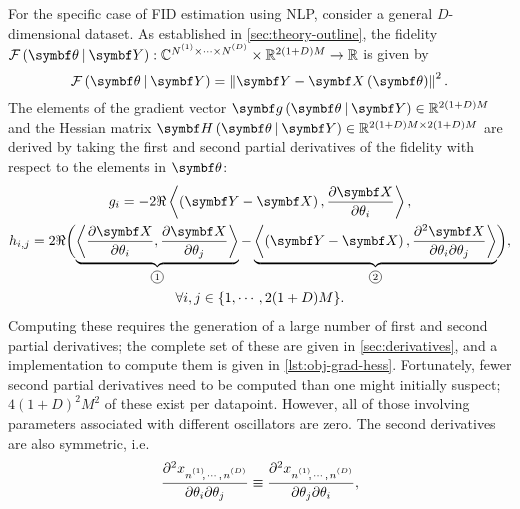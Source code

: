 For the specific case of \ac{FID} estimation using \ac{NLP}, consider a general
$D$-dimensional dataset. As established in \cref{sec:theory-outline}, the
fidelity $\FthY : \mathbb{C}^{\None \times \cdots \times \ND} \times
\mathbb{R}^{2(1 + D)M} \rightarrow \mathbb{R}$ is given by
\begin{equation}
    \FthY = \left \lVert \bY - \bXth \right \rVert^2.
    \label{eq:fidelity}
\end{equation}
The elements of the gradient vector $\bdgthY \in \mathbb{R}^{2(1+D)M}$ and
the Hessian matrix $\bdHthY \in \mathbb{R}^{2(1+D)M \times 2(1+D)M}$ are
derived by taking the first and second partial derivatives of the fidelity with
respect to the elements in $\bth$:
\begin{subequations}
    \begin{gather}
        g_i = -2 \Re
                \left\langle
                    \left(\bY - \bX\right),
                    \frac{\partial \bX}{\partial \theta_i}
                \right\rangle,
        \label{eq:grad} \\
        h_{i,j} = 2 \Re
            \biggl(
                \underbrace{
                    \left\langle
                        \frac{\partial \bX}{\partial \theta_i},
                        \frac{\partial \bX}{\partial \theta_j}
                    \right\rangle
                }_{\circled{1}}
                -
                \underbrace{
                    \left\langle
                        \left(\bY - \bX\right),
                        \frac{\partial^2 \bX}{\partial \theta_i \partial \theta_j}
                    \right\rangle
                }_{\circled{2}}
            \biggl),
            \label{eq:hess}\\
        \forall i,j \in \lbrace 1, \cdots, 2(1+D)M \rbrace.\notag
    \end{gather}
    \label{eq:fidelity-grad-hess}%
\end{subequations}
Computing these requires the generation of a large number of first and second
partial derivatives; the complete set of these are given in
\cref{sec:derivatives}, and a \Python implementation to compute them is given
in \cref{lst:obj-grad-hess}.
Fortunately, fewer second partial derivatives need to be computed than one
might initially suspect; $4(1 + D)^2 M^2$ of these exist per datapoint.
However, all of those involving parameters associated with different
oscillators are zero. The second derivatives are also symmetric, i.e.
\[
    \frac{\partial^2 x_{\nonedotsnD}}{\partial \theta_i \partial \theta_j} \equiv
    \frac{\partial^2 x_{\nonedotsnD}}{\partial \theta_j \partial \theta_i},
\]
